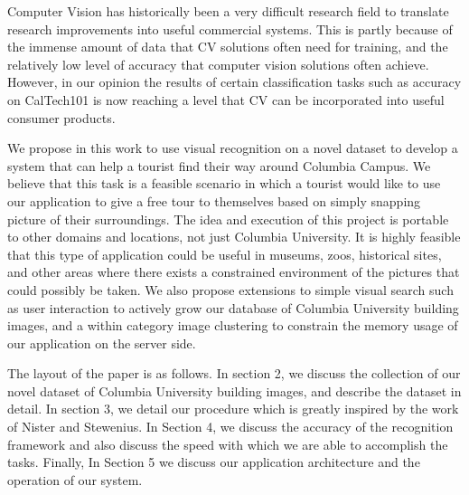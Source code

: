 Computer Vision has historically been a very difficult research field to translate research improvements into useful commercial systems.  
This is partly because of the immense amount of data that CV solutions often need for training, and the relatively low level of accuracy that computer vision solutions often achieve.
However, in our opinion the results of certain classification tasks such as accuracy on CalTech101\cite{fei-fei:caltech101} is now reaching a level that CV can be incorporated into useful consumer products.

We propose in this work to use visual recognition on a novel dataset to develop a system that can help a tourist find their way around Columbia Campus.
We believe that this task is a feasible scenario in which a tourist would like to use our application to give a free tour to themselves based on simply snapping picture of their surroundings.
The idea and execution of this project is portable to other domains and locations, not just Columbia University.
It is highly feasible that this type of application could be useful in museums, zoos, historical sites, and other areas where there exists a constrained environment of the pictures that could possibly be taken.
We also propose extensions to simple visual search such as user interaction to actively grow our database of Columbia University building images, and a within category image clustering to constrain the memory usage of our application on the server side.

The layout of the paper is as follows.
In section 2, we discuss the collection of our novel dataset of Columbia University building images, and describe the dataset in detail.
In section 3, we detail our procedure which is greatly inspired by the work of Nister and Stewenius\cite{nister:vocabtree}.
In Section 4, we discuss the accuracy of the recognition framework and also discuss the speed with which we are able to accomplish the tasks.
Finally, In Section 5 we discuss our application architecture and the operation of our system.
